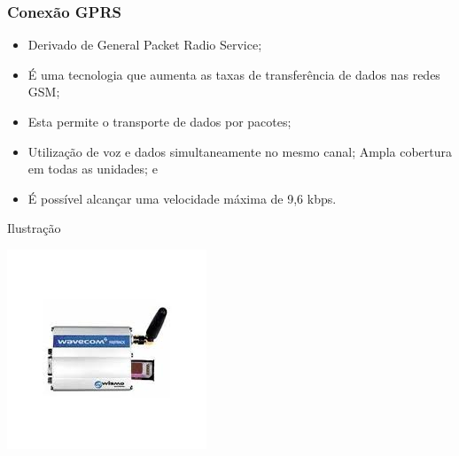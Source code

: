 \documentclass[aspectratio=169]{beamer} %
\begin{document}
\begin{frame}
	\frametitle{Conexão GPRS}
			
	\begin{itemize}
		\item Derivado de General Packet Radio Service;
		\item É uma tecnologia que aumenta as taxas de transferência de dados nas redes GSM;
		\item Esta permite o transporte de dados por pacotes;
		\item Utilização de voz e dados simultaneamente no mesmo canal; Ampla cobertura em todas as unidades; e
		\item É possível alcançar uma velocidade máxima de 9,6 kbps.
	\end{itemize}\vfill
	
	\begin{exampleblock}{Ilustra\c cão}
		\begin{center}
			\includegraphics[scale=0.4]{img/modem-gprs}
		\end{center}
	\end{exampleblock}
\end{frame}
\end{document}
